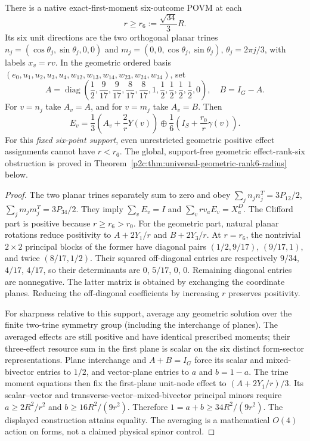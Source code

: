\documentclass[12pt,a4paper]{article}
\begin{document}
\begin{theorem}
\label{p2c:thm:v266-six-trines}
There is a native exact-first-moment six-outcome POVM at each
\[
\boxed{r\ge r_6:=\frac{\sqrt{34}}3R.}
\]
Its six unit directions are the two orthogonal planar trines
$n_j=(\cos\theta_j,\sin\theta_j,0,0)$ and
$m_j=(0,0,\cos\theta_j,\sin\theta_j)$,
$\theta_j=2\pi j/3$, with labels $x_v=rv$. In the geometric ordered
basis $(e_0,u_1,u_2,u_3,u_4,w_{12},w_{13},w_{14},w_{23},w_{24},w_{34})$,
set
\[
A=\operatorname{diag}\left(\frac12,\frac9{17},\frac9{17},
\frac8{17},\frac8{17},1,\frac12,\frac12,\frac12,\frac12,0\right),
\quad B=I_G-A.
\]
For $v=n_j$ take $A_v=A$, and for $v=m_j$ take $A_v=B$. Then
\[
\boxed{E_v=\frac13\left(A_v+\frac2rY(v)\right)\oplus
\frac16\left(I_S+\frac{r_0}{r}\gamma(v)\right).}
\]
For this \emph{fixed six-point support}, even unrestricted geometric
positive effect assignments cannot have $r<r_6$. The global, support-free
geometric effect-rank-six obstruction is proved in
Theorem~\ref{p2c:thm:universal-geometric-rank6-radius} below.
\end{theorem}
\begin{proof}
The two planar trines separately sum to zero and obey
$\sum_{j}n_jn_j^T=3P_{12}/2$, $\sum_{j}m_jm_j^T=3P_{34}/2$.
They imply $\sum_vE_v=I$ and
$\sum_vrv_aE_v=X_a^D$. The Clifford part is positive because
$r\ge r_6>r_0$. For the geometric part, natural planar rotations
reduce positivity to $A+2Y_1/r$ and $B+2Y_3/r$.
At $r=r_6$, the nontrivial $2\times2$ principal blocks of the former
have diagonal pairs $(1/2,9/17)$, $(9/17,1)$, and twice
$(8/17,1/2)$. Their squared off-diagonal entries are respectively
$9/34$, $4/17$, $4/17$, so their determinants are
$0$, $5/17$, $0$, $0$. Remaining diagonal entries are nonnegative.
The latter matrix is obtained by exchanging the coordinate planes.
Reducing the off-diagonal coefficients by increasing $r$ preserves
positivity.

For sharpness relative to this support, average any geometric solution
over the finite two-trine symmetry group (including the interchange of
planes). The averaged effects are still positive and have identical
prescribed moments; their three-effect resource sum in the first plane
is scalar on the six distinct form-sector representations. Plane
interchange and $A+B=I_G$ force its scalar and mixed-bivector entries
to $1/2$, and vector-plane entries to $a$ and $b=1-a$.
The trine moment equations then fix the first-plane unit-node effect
to $(A+2Y_1/r)/3$. Its scalar--vector and
transverse-vector--mixed-bivector principal minors require
$a\ge2R^2/r^2$ and $b\ge16R^2/(9r^2)$.
Therefore $1=a+b\ge34R^2/(9r^2)$. The displayed construction
attains equality. The averaging is a mathematical $O(4)$ action on
forms, not a claimed physical spinor control.
\end{proof}
\end{document}
